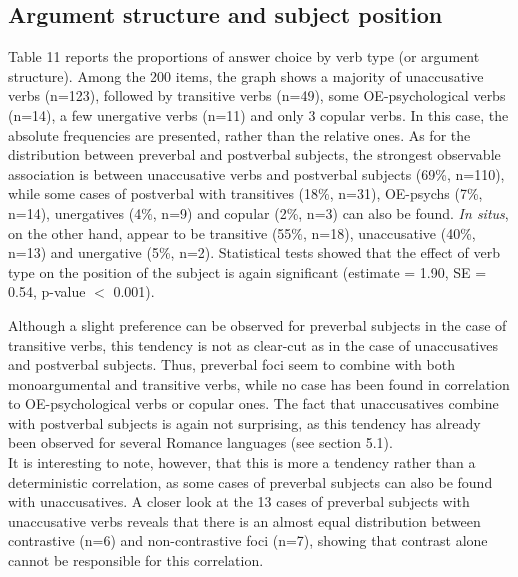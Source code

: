 \subsection{Argument structure and subject position}
Table 11 reports the proportions of answer choice by verb type (or argument structure). Among the 200 items, the graph shows a majority of unaccusative verbs (n=123), followed by transitive verbs (n=49), some OE-psychological verbs (n=14), a few unergative verbs (n=11) and only 3 copular verbs. In this case, the absolute frequencies are presented, rather than the relative ones. 
As for the distribution between preverbal and postverbal subjects, the strongest observable association is between unaccusative verbs and postverbal subjects (69\%, n=110), while some cases of postverbal with transitives (18\%, n=31), OE-psychs (7\%, n=14), unergatives (4\%, n=9) and copular (2\%, n=3) can also be found. \textit{In situs}, on the other hand, appear to be transitive (55\%, n=18), unaccusative (40\%, n=13) and unergative (5\%, n=2). Statistical tests showed that the effect of verb type on the position of the subject is again significant (estimate = 1.90, SE = 0.54, p-value $<$ 0.001).\\

\begin{table}
\caption{Spanish subject position by argument structure}
\end{table}



Although a slight preference can be observed for preverbal subjects in the case of transitive verbs, this tendency is not as clear-cut as in the case of unaccusatives and postverbal subjects. Thus, preverbal foci seem to combine with both monoargumental and transitive verbs, while no case has been found in correlation to OE-psychological verbs or copular ones. 
The fact that unaccusatives combine with postverbal subjects is again not surprising, as this tendency has already been observed for several Romance languages (see section 5.1). \\
It is interesting to note, however, that this is more a tendency rather than a deterministic correlation, as some cases of preverbal subjects can also be found with unaccusatives. A closer look at the 13 cases of preverbal subjects with unaccusative verbs reveals that there is an almost equal distribution between contrastive (n=6) and non-contrastive foci (n=7), showing that contrast alone cannot be responsible for this correlation.


